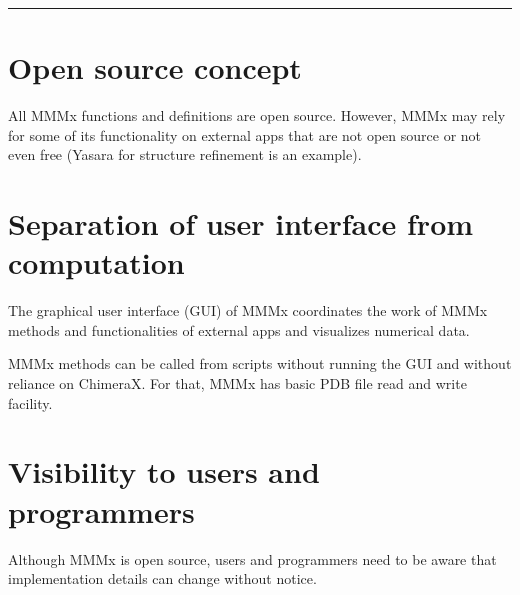 \documentclass[letterpaper,10pt,english]{sphinxmanual}
\begin{document}
\bigskip\hrule\bigskip



\section{Open source concept}
\label{\detokenize{concept:open-source-concept}}
All MMMx functions and definitions are open source. However, MMMx may rely for some of its functionality on external apps that are not open source or not even free (Yasara for structure refinement is an example).


\section{Separation of user interface from computation}
\label{\detokenize{concept:separation-of-user-interface-from-computation}}
The graphical user interface (GUI) of MMMx coordinates the work of MMMx methods and functionalities of external apps and visualizes numerical data.

MMMx methods can be called from scripts without running the GUI and without reliance on ChimeraX. For that, MMMx has basic PDB file read and write facility.


\section{Visibility to users and programmers}
\label{\detokenize{concept:visibility-to-users-and-programmers}}
Although MMMx is open source, users and programmers need to be aware that implementation details can change without notice.
\end{document}
